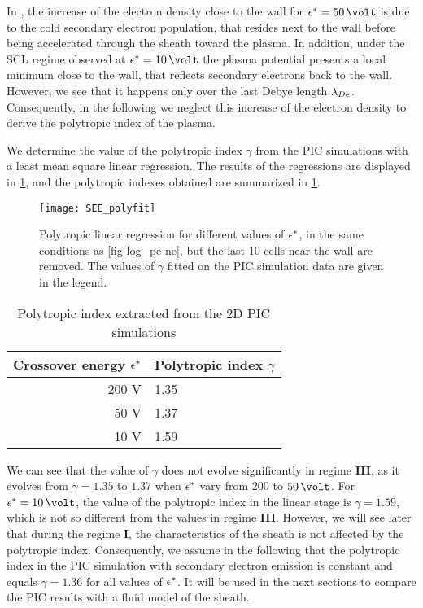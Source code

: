 In , the increase of the electron density close to the wall for $\crover=50\,\volt$ is due to the cold secondary electron population, that resides next to the wall before being accelerated through the sheath toward the plasma.
In addition, under the \ac{SCL} regime observed at $\crover = 10\,\volt$ the plasma potential presents a local minimum close to the wall, that reflects secondary electrons back to the wall.
However, we see that it happens only over the last Debye length $\lambda_{De}$.
Consequently, in the following we neglect this increase of the electron density  to derive the polytropic index of the plasma.

We determine the value of the polytropic index $\gamma$ from the \ac{PIC} simulations with a least mean square linear regression.
The results of the regressions are displayed in \cref{fig-polyfit_see}, and the polytropic indexes obtained are summarized in \cref{tab-summarygamma}.


\begin{figure}[!htb]
  \centering
  \texttt{[image: SEE\_polyfit]}
  \caption{Polytropic linear regression for different values of $\epsilon^{*}$, in the same conditions as \cref{fig-log_pe-ne}, but the last 10 cells near the wall are removed. The values of $\gamma$ fitted on the \acs{PIC} simulation data are given in the legend.}
  \label{fig-polyfit_see}
\end{figure}

\begin{table}[!htb]
  \centering
  \caption{Polytropic index extracted from the \acs{2D}  \acs{PIC} simulations}
  \label{tab-summarygamma}
  \begin{tabular}{@{}r l@{}} \toprule
  Crossover energy $\epsilon^{*}$ & Polytropic index $\gamma$ \\ \midrule
  200 V & 1.35 \\
  50 V & 1.37 \\
  10 V & 1.59 \\
  \bottomrule
  \end{tabular}
\end{table}


We can see that the value of $\gamma$ does not evolve significantly in regime {\bf III}, as it evolves from $\gamma=1.35$  to $1.37$ when $\epsilon^{*}$ vary from $200$ to $50\,\volt$.
For $\crover=10\,\volt$, the value of the polytropic index in the linear stage is $\gamma=1.59$, which is not so different from the values in regime {\bf III}.
However, we will see later that during the regime {\bf I}, the characteristics of the sheath is not affected by the polytropic index. 
Consequently, we assume in the following that the polytropic index in the \ac{PIC} simulation with secondary electron emission is constant and equals $\gamma=1.36$ for all values of $\epsilon^{*}$.
It will be used in the next sections to compare the \ac{PIC} results with a fluid model of the sheath.


